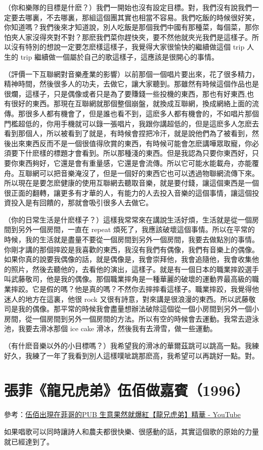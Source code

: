 \documentclass[UTF8,a4paper,oneside,twocolumn,12pt]{ctexbook}
\begin{document}
（你和樂隊的目標是什麽？）我們一開始也沒有設定目標。對，我們沒有說我們一定要去哪裏，不去哪裏，那組這個團其實也相當不容易。我們吃飯的時候很好笑，你知道嗎？我們後來才知道說，別人吃飯是那個我們中國有那種菜，每個菜，那你怕夾人家沒得夾對不對？那麽我們菜你趕快夾，要不然他就夾光我們是這樣子。所以沒有特別的想說一定要怎麽樣這樣子，我覺得大家很愉快的繼續做這個 trip 人生的 trip 繼續做一個屬於自己的歌這樣子，這應該是很開心的事情。

（評價一下互聯網對音樂產業的影響）以前那個一個唱片要出來，花了很多精力，精神時間，然後很多人的功夫，去做它，讓大家聽到。那雖然有時候這個作品也是很爛，這樣子，只是偶像或者只是為了要賺錢一些投機的東西，那也有好東西,也有很好的東西。那現在互聯網就那個整個崩盤，就換成互聯網，換成網絡上面的流傳。那很多人都有機會了，但是誰也看不到，這麽多人都有機會的，不如唱片那個門檻超低的，你用手機就可以錄一張唱片，我跟你講超低的，但是這麽多人怎麽去看到那個人，所以被看到了就是，有時候會捏把冷汗，就是說他們為了被看到，然後出來東西反而不是一個很值得欣賞的東西，有時候可能會怎麽講嘩眾取寵，你必須要下什麽樣的標題才會看到。所以那種淺的東西。但是我認為只要你東西好，只要你東西夠好，它還是會有重量感，它還是會流傳。所以它可能水能載舟，亦能覆舟。互聯網可以把音樂淹沒了，但是一個好的東西它也可以透過物聯網流傳下來。所以現在是要怎麽健康的使用互聯網去聽取音樂，就是要付錢，讓這個東西是一個很正面的翻轉，讓更多有才華的人，有能力的人去投入音樂的這個事情，讓這個投資投入是有回饋的，那就會吸引很多人去做它。

（你的日常生活是什麽樣子？）這樣我常常來在講說生活好煩，生活就是從一個房間到另外一個房間，一直在 repeat 煩死了，我應該破壞這個事情。所以在平常的時候，我的生活就是盡量不要從一個房間到另外一個房間，我要去做點別的事情。你剛才講的那個摔跤是我喜歡的東西，我沒有我們有偶像，我們有音樂上的偶像。如果你真的說要我偶像的話，就是偶像是，我會崇拜他，我會追隨他，我會收集他的照片，然後去聽他的，去看他的演出，這樣子。就是有一個日本的職業摔跤選手叫武藤敬司，他是我的偶像。那個職業摔角是一種華麗的破壞的運動界最高級的職業摔跤。它是假的嗎？他是真的嗎？不然你去摔摔看這樣子。職業摔跤，我覺得他迷人的地方在這裏，他很 rock 又很有詩意，對來講是很浪漫的東西。所以武藤敬司是我的偶像。那平常的時候我會盡量想辦法破除這個從一個小房間到另外一個小房間，從一個房間到另外一個房間的方法。所以有空的時候會去運動。我常去遊泳池，我要去滑冰那個 ice cake 滑冰，然後我有去滑雪，做一些運動。

（有什麽音樂以外的小目標嗎？）我希望我的滑冰的華爾茲跳可以跳高一點。我練好久，我練了一年了我看到別人這樣噗呲跳那麽高，我希望可以再跳好一點。對。

\section{張菲《龍兄虎弟》伍佰做嘉賓（1996）}
參考：\href{https://www.youtube.com/watch?v=i_j0UOQOj1Q}{伍佰出現在菲哥的PUB 生意果然就爆紅【龍兄虎弟】精華 - YouTube}

如果唱歌可以同時讓詩人和農夫都很快樂、很感動的話，其實這個歌的原始的力量就已經達到了。

\backmatter
\end{document}
